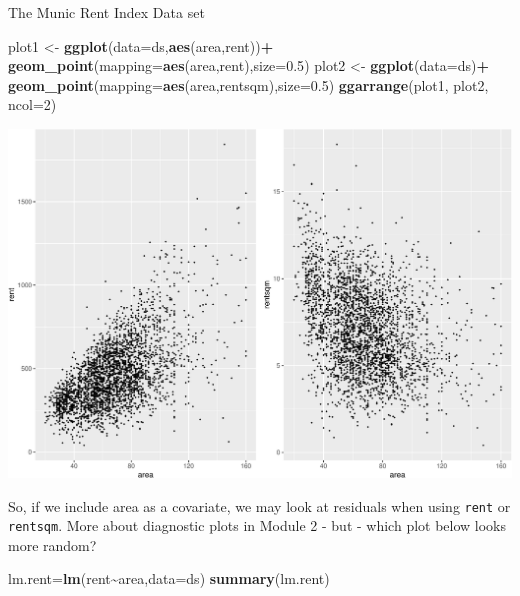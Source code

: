 \documentclass[
  ignorenonframetext,
]{beamer}
\newenvironment{Shaded}{\begin{snugshade}}{\end{snugshade}}
\newcommand{\AttributeTok}[1]{\textcolor[rgb]{0.13,0.29,0.53}{#1}}
\newcommand{\DecValTok}[1]{\textcolor[rgb]{0.00,0.00,0.81}{#1}}
\newcommand{\FloatTok}[1]{\textcolor[rgb]{0.00,0.00,0.81}{#1}}
\newcommand{\FunctionTok}[1]{\textcolor[rgb]{0.13,0.29,0.53}{\textbf{#1}}}
\newcommand{\NormalTok}[1]{#1}
\newcommand{\OtherTok}[1]{\textcolor[rgb]{0.56,0.35,0.01}{#1}}
\newcommand{\SpecialCharTok}[1]{\textcolor[rgb]{0.81,0.36,0.00}{\textbf{#1}}}
\begin{document}
\begin{frame}[fragile]
\begin{block}{The Munic Rent Index Data set}
\begin{Shaded}
\begin{Highlighting}[]
\NormalTok{plot1 }\OtherTok{\textless{}{-}} \FunctionTok{ggplot}\NormalTok{(}\AttributeTok{data=}\NormalTok{ds,}\FunctionTok{aes}\NormalTok{(area,rent))}\SpecialCharTok{+}
  \FunctionTok{geom\_point}\NormalTok{(}\AttributeTok{mapping=}\FunctionTok{aes}\NormalTok{(area,rent),}\AttributeTok{size=}\FloatTok{0.5}\NormalTok{)}
\NormalTok{plot2 }\OtherTok{\textless{}{-}} \FunctionTok{ggplot}\NormalTok{(}\AttributeTok{data=}\NormalTok{ds)}\SpecialCharTok{+}
  \FunctionTok{geom\_point}\NormalTok{(}\AttributeTok{mapping=}\FunctionTok{aes}\NormalTok{(area,rentsqm),}\AttributeTok{size=}\FloatTok{0.5}\NormalTok{)}
\FunctionTok{ggarrange}\NormalTok{(plot1, plot2, }\AttributeTok{ncol=}\DecValTok{2}\NormalTok{)}
\end{Highlighting}
\end{Shaded}

\includegraphics{1Intro_files/figure-beamer/unnamed-chunk-11-1.pdf}

So, if we include area as a covariate, we may look at residuals when
using \texttt{rent} or \texttt{rentsqm}. More about diagnostic plots in
Module 2 - but - which plot below looks more random?

\begin{Shaded}
\begin{Highlighting}[]
\NormalTok{lm.rent}\OtherTok{=}\FunctionTok{lm}\NormalTok{(rent}\SpecialCharTok{\textasciitilde{}}\NormalTok{area,}\AttributeTok{data=}\NormalTok{ds)}
\FunctionTok{summary}\NormalTok{(lm.rent)}
\end{Highlighting}
\end{Shaded}


\end{block}
\end{frame}
\end{document}
